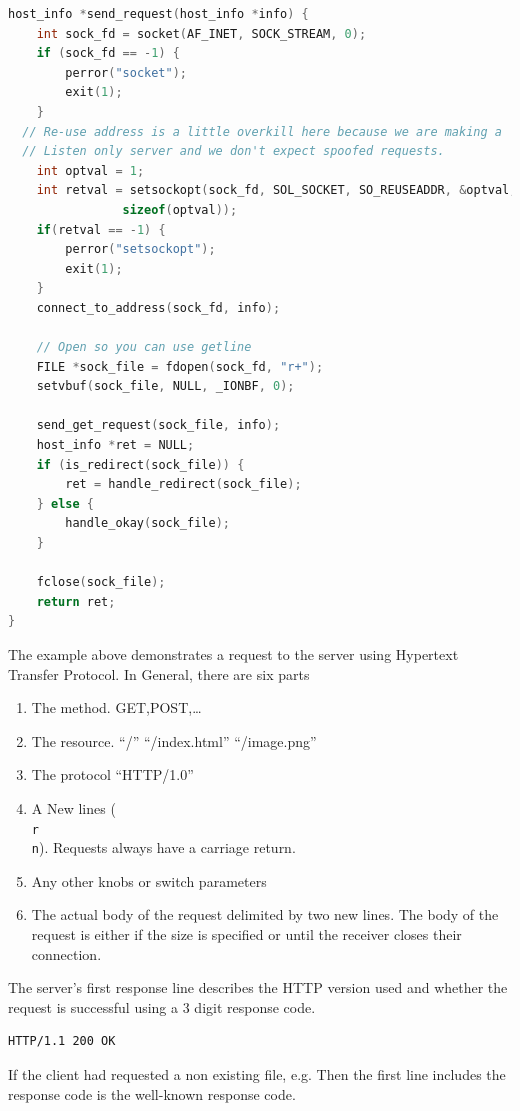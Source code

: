 \begin{lstlisting}[language=C]
host_info *send_request(host_info *info) {
	int sock_fd = socket(AF_INET, SOCK_STREAM, 0);
	if (sock_fd == -1) {
		perror("socket");
		exit(1);
	}
  // Re-use address is a little overkill here because we are making a
  // Listen only server and we don't expect spoofed requests.
	int optval = 1;
	int retval = setsockopt(sock_fd, SOL_SOCKET, SO_REUSEADDR, &optval,
				sizeof(optval));
	if(retval == -1) {
		perror("setsockopt");
		exit(1);
	}
	connect_to_address(sock_fd, info);

	// Open so you can use getline
	FILE *sock_file = fdopen(sock_fd, "r+");
	setvbuf(sock_file, NULL, _IONBF, 0);

	send_get_request(sock_file, info);
	host_info *ret = NULL;
	if (is_redirect(sock_file)) {
		ret = handle_redirect(sock_file);
	} else {
		handle_okay(sock_file);
	}

	fclose(sock_file);
	return ret;
}
\end{lstlisting}

The example above demonstrates a request to the server using Hypertext Transfer Protocol.
In General, there are six parts

\begin{enumerate}
\item The method. GET,POST,\ldots{}
\item The resource. ``/'' ``/index.html'' ``/image.png''
\item The protocol ``HTTP/1.0''
\item A New lines (\texttt{\\r\\n}). Requests always have a carriage return.
\item Any other knobs or switch parameters
\item The actual body of the request delimited by two new lines. The body of the request is either if the size is specified or until the receiver closes their connection.
\end{enumerate}

The server's first response line describes the HTTP version used and whether the request is successful using a 3 digit response code.

\begin{lstlisting}
HTTP/1.1 200 OK
\end{lstlisting}

If the client had requested a non existing file, e.g.
 Then the first line includes the response code is the well-known  response code.

